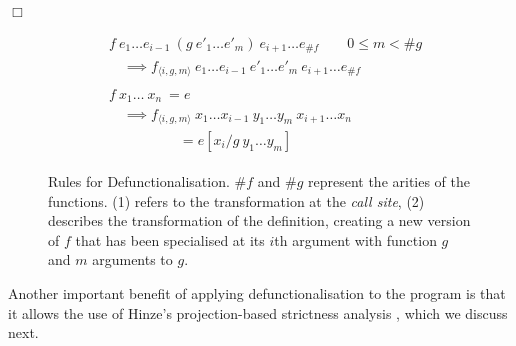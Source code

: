 \hfill$\Box$

\begin{figure}[t]
 \begin{align}
  \begin{split}
   &f \ e_{1} \dots e_{i-1}\ (g \ e'_{1} \dots e'_{m})\ e_{i+1} \dots e_{\#f} \qquad 0 \leq m < \#g\\
   &\quad \implies f_{\langle i,g,m\rangle} \ e_{1} \dots e_{i-1}\ e'_{1} \dots e'_{m} \ e_{i+1} \dots e_{\#f}
  \end{split}\\[10pt]
  \begin{split}
  &f \ x_{1} \dots \ x_{n} \ = e \\
  &\quad \implies f_{\langle i,g,m\rangle} \ x_{1} \dots x_{i-1}\ y_{1} \dots y_{m}\ x_{i+1} \dots x_{n} \\
  & \qquad \qquad \quad = e[x_{i}/g\ y_{1} \dots y_{m}]
  \end{split}
 \end{align}
\caption{Rules for Defunctionalisation. $\#f$ and $\#g$ represent the arities of the functions.
        (1) refers to the transformation at the \emph{call site},
        (2) describes the transformation of the definition, creating a new version of $f$ that has
        been specialised at its $i$th argument with function $g$ and $m$ arguments to $g$.}
\label{defunRules}
\end{figure}

Another important benefit of applying defunctionalisation to the program is
that it allows the use of Hinze's projection-based strictness analysis
\citep{hinze1995projection}, which we discuss next.
